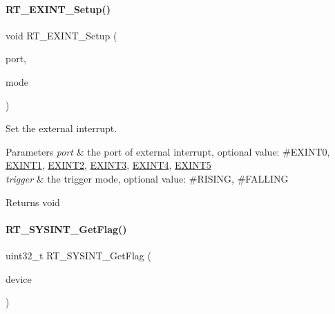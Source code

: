 \paragraph{\texorpdfstring{R\+T\+\_\+\+E\+X\+I\+N\+T\+\_\+\+Setup()}{RT\_EXINT\_Setup()}}
{\footnotesize\ttfamily void R\+T\+\_\+\+E\+X\+I\+N\+T\+\_\+\+Setup (\begin{DoxyParamCaption}\item[{\mbox{\hyperlink{a00011_af11f5754cc92430795a63bb53d964cd4}{E\+X\+T\+I\+N\+T\+\_\+\+P\+O\+RT}}}]{port,  }\item[{\mbox{\hyperlink{a00020_a6d33f21be3f0c5cf91c5d638e8aca086}{trigger\+\_\+mode\+\_\+t}}}]{mode }\end{DoxyParamCaption})\hspace{0.3cm}{\ttfamily [inline]}}



Set the external interrupt. 


\begin{DoxyParams}{Parameters}
{\em port} & the port of external interrupt, optional value\+: \#\+E\+X\+I\+N\+T0, \mbox{\hyperlink{a00011_af11f5754cc92430795a63bb53d964cd4a6c87103fd7c63fc99ee4b631c0a4dac4}{E\+X\+I\+N\+T1}}, \mbox{\hyperlink{a00011_af11f5754cc92430795a63bb53d964cd4a92c5398067978d1aefd4ba3c276dec32}{E\+X\+I\+N\+T2}}, \mbox{\hyperlink{a00011_af11f5754cc92430795a63bb53d964cd4a3c37ddaa34bf4297b421d8577be06895}{E\+X\+I\+N\+T3}}, \mbox{\hyperlink{a00011_af11f5754cc92430795a63bb53d964cd4a766aca243fc0f7aa292c791202bef6e7}{E\+X\+I\+N\+T4}}, \mbox{\hyperlink{a00011_af11f5754cc92430795a63bb53d964cd4af59c814bf9818345f24bb79e7533945c}{E\+X\+I\+N\+T5}} \\
\hline
{\em trigger} & the trigger mode, optional value\+: \#\+R\+I\+S\+I\+NG, \#\+F\+A\+L\+L\+I\+NG \\
\hline
\end{DoxyParams}
\begin{DoxyReturn}{Returns}
void 
\end{DoxyReturn}
\mbox{\label{a00011_aca7d297005ee41b91c0e638a40bec585}} 
\paragraph{\texorpdfstring{R\+T\+\_\+\+S\+Y\+S\+I\+N\+T\+\_\+\+Get\+Flag()}{RT\_SYSINT\_GetFlag()}}
{\footnotesize\ttfamily uint32\+\_\+t R\+T\+\_\+\+S\+Y\+S\+I\+N\+T\+\_\+\+Get\+Flag (\begin{DoxyParamCaption}\item[{\mbox{\hyperlink{a00011_afa38f6b3d96898de1e521bf88e097a4c}{S\+Y\+S\+I\+N\+T\+\_\+\+D\+E\+V\+I\+CE}}}]{device }\end{DoxyParamCaption})\hspace{0.3cm}{\ttfamily [inline]}}



